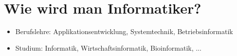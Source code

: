 \section{Wie wird man Informatiker?}

\begin{itemize}
\item Berufslehre: Applikationsentwicklung, Systemtechnik, Betriebsinformatik
\item Studium: Informatik, Wirtschaftsinformatik, Bioinformatik, ...
\end{itemize}

